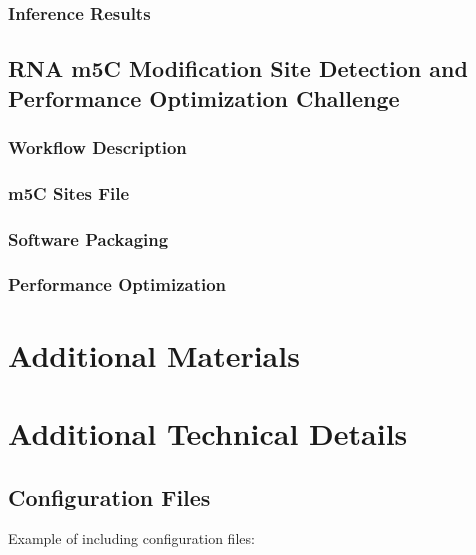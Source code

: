\documentclass[a4paper,12pt]{article}
\begin{document}
\subsubsection{Inference Results}

\subsection{RNA m5C Modification Site Detection and Performance Optimization Challenge}

\subsubsection{Workflow Description}

\subsubsection{m5C Sites File}

\subsubsection{Software Packaging}

\subsubsection{Performance Optimization}

\newpage

\section{Additional Materials}

\newpage

\appendix
\section{Additional Technical Details}
\subsection{Configuration Files}
Example of including configuration files:
\end{document}
